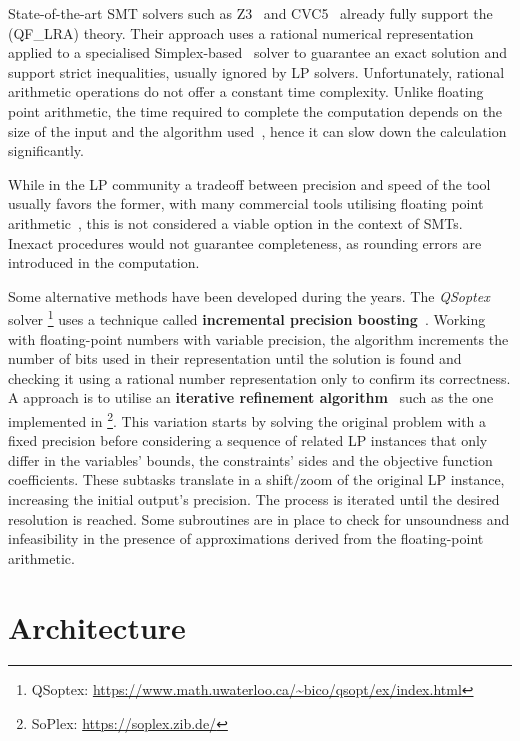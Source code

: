 \documentclass[runningheads]{llncs}
\begin{document}
State-of-the-art SMT solvers such as Z3~\cite{ref:z3} and CVC5~\cite{ref:cvc5} already fully support the (QF\_LRA) theory.
Their approach uses a rational numerical representation applied to a specialised Simplex-based~\cite{ref:simplex} solver to guarantee an exact solution and support strict inequalities, usually ignored by LP solvers.
Unfortunately, rational arithmetic operations do not offer a constant time complexity. %
Unlike floating point arithmetic, the time required to complete the computation depends on the size of the input and the algorithm used~\cite{ref:fft-mult}, hence it can slow down the calculation significantly.

While in the LP community a tradeoff between precision and speed of the tool usually favors the former, with many commercial tools utilising floating point arithmetic~\cite{ref:gurobi}, this is not considered a viable option in the context of SMTs.
Inexact procedures would not guarantee completeness, as rounding errors are introduced in the computation.

Some alternative methods have been developed during the years.
The \textit{QSoptex} solver \footnote{QSoptex: \url{https://www.math.uwaterloo.ca/~bico/qsopt/ex/index.html}} uses a technique called \textbf{incremental precision boosting}~\cite{ref:precision-boosting}.
Working with floating-point numbers with variable precision, the algorithm increments the number of bits used in their representation until the solution is found and checking it using a rational number representation only to confirm its correctness.
A approach is to utilise an \textbf{iterative refinement algorithm}~\cite{ref:iterative-refinement} such as the one implemented in \soplex \footnote{SoPlex: \url{https://soplex.zib.de/}}.
This variation starts by solving the original problem with a fixed precision before considering a sequence of related LP instances that only differ in the variables' bounds, the constraints' sides and the objective function coefficients.
These subtasks translate in a shift/zoom of the original LP instance, increasing the initial output's precision.
The process is iterated until the desired resolution is reached.
Some subroutines are in place to check for unsoundness and infeasibility in the presence of approximations derived from the floating-point arithmetic.

\section{Architecture}
\end{document}
